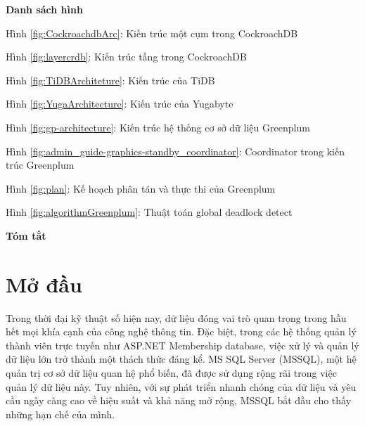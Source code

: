 \documentclass[14pt]{article}
\begin{document}
\pagebreak

        \begin{center}
\textbf{Danh sách hình}
\end{center}  

Hình \ref{fig:CockroachdbArc}: Kiến trúc một cụm trong CockroachDB \dotfill \pageref{fig:CockroachdbArc}

Hình \ref{fig:layercrdb}: Kiến trúc tầng trong CockroachDB \dotfill \pageref{fig:layercrdb}

Hình \ref{fig:TiDBArchiteture}: Kiến trúc của  TiDB \dotfill \pageref{fig:TiDBArchiteture}

Hình \ref{fig:YugaArchitecture}: Kiến trúc của Yugabyte \dotfill \pageref{fig:YugaArchitecture}

Hình \ref{fig:gp-architecture}: Kiến trúc hệ thống cơ sở dữ liệu Greenplum \dotfill \pageref{fig:gp-architecture}

Hình \ref{fig:admin_guide-graphics-standby_coordinator}: Coordinator trong kiến trúc Greenplum \dotfill \pageref{fig:admin_guide-graphics-standby_coordinator}

Hình \ref{fig:plan}: Kế hoạch phân tán và thực thi của Greenplum  \dotfill \pageref{fig:plan}

Hình \ref{fig:algorithmGreenplum}: Thuật toán global deadlock detect \dotfill \pageref{fig:algorithmGreenplum}


    

 \begin{center}
\textbf{Tóm tắt}

\pagebreak

\end{center}

    {
    
    }

    
    


    


    
\section{Mở đầu}
Trong thời đại kỹ thuật số hiện nay, dữ liệu đóng vai trò quan trọng trong hầu hết mọi khía cạnh của công nghệ thông tin. Đặc biệt, trong các hệ thống quản lý thành viên trực tuyến như ASP.NET Membership database, việc xử lý và quản lý dữ liệu lớn trở thành một thách thức đáng kể. MS SQL Server (MSSQL), một hệ quản trị cơ sở dữ liệu quan hệ phổ biến, đã được sử dụng rộng rãi trong việc quản lý dữ liệu này. Tuy nhiên, với sự phát triển nhanh chóng của dữ liệu và yêu cầu ngày càng cao về hiệu suất và khả năng mở rộng, MSSQL bắt đầu cho thấy những hạn chế của mình.
\end{document}

